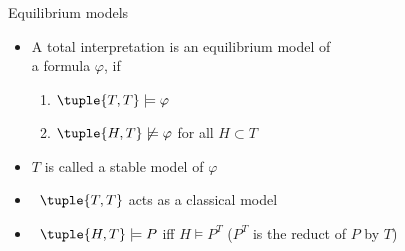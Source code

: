 \begin{frame}{Equilibrium models}
  \begin{itemize}
  \item A total interpretation  is an \alert{equilibrium model} of\\
    a formula $\varphi$,
    if
    \par
    \smallskip
    \begin{enumerate}\normalsize
    \item
      \(
      \tuple{T,T}\models\varphi
      \)
    \item
      \(
      \tuple{H,T}\not\models\varphi
      \)
      for all $H\subset T$
    \end{enumerate}
    \smallskip
  \item <2-> $T$ is called a \alert{stable model} of $\varphi$
    \bigskip
  \item<3->  \ $\tuple{T,T}$ acts as a classical model
    \smallskip
  \item<4->  \ $\tuple{H,T} \models P$ iff $H \models P^T$ \hfill ($P^T$ is the reduct of $P$ by $T$)
  \end{itemize}
\end{frame}
%
